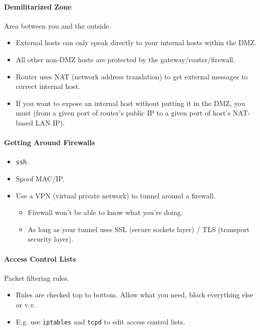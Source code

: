 \documentclass[twocolumn,english]{article}
\let\emph\relax
\begin{document}
\paragraph{Demilitarized Zone}

Area between you and the outside.
\begin{itemize}
\item External hosts can only speak directly to your internal hosts within
the DMZ.
\item All other non-DMZ hosts are protected by the gateway/router/firewall.
\item Router uses NAT (network address translation) to get external messages
to correct internal host.
\item If you want to expose an internal host without putting it in the DMZ,
you must \emph{port forward} (from a given port of router's public
IP to a given port of host's NAT-based LAN IP).
\end{itemize}

\paragraph{Getting Around Firewalls}
\begin{itemize}
\item \texttt{ssh}.
\item Spoof MAC/IP.
\item Use a VPN (virtual private network) to tunnel around a firewall.
\begin{itemize}
\item Firewall won't be able to know what you're doing.
\item As long as your tunnel uses SSL (secure sockets layer) / TLS (transport
security layer).
\end{itemize}
\end{itemize}

\paragraph{Access Control Lists}

Packet filtering rules.
\begin{itemize}
\item Rules are checked top to bottom. Allow what you need, block everything
else or v.v.
\item E.g. use \texttt{iptables} and \texttt{tcpd} to edit access control
lists.
\end{itemize}
\end{document}
